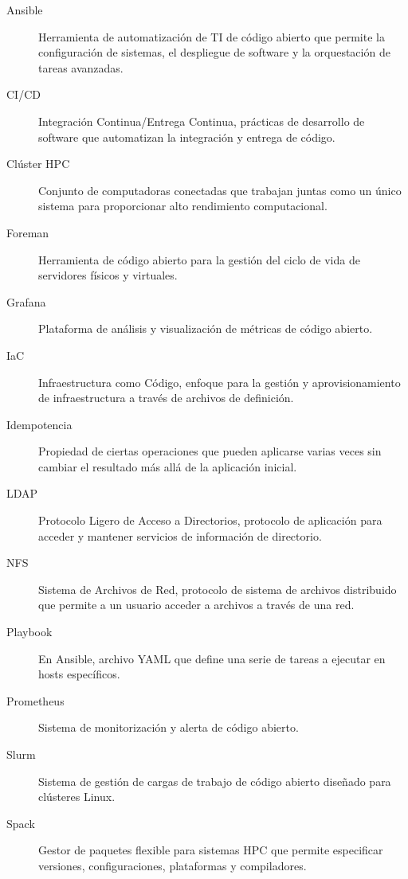 \documentclass[12pt,a4paper]{report}
\begin{document}
\begin{description}
    \item[Ansible] Herramienta de automatización de TI de código abierto que permite la configuración de sistemas, el despliegue de software y la orquestación de tareas avanzadas.
    
    \item[CI/CD] Integración Continua/Entrega Continua, prácticas de desarrollo de software que automatizan la integración y entrega de código.
    
    \item[Clúster HPC] Conjunto de computadoras conectadas que trabajan juntas como un único sistema para proporcionar alto rendimiento computacional.
    
    \item[Foreman] Herramienta de código abierto para la gestión del ciclo de vida de servidores físicos y virtuales.
    
    \item[Grafana] Plataforma de análisis y visualización de métricas de código abierto.
    
    \item[IaC] Infraestructura como Código, enfoque para la gestión y aprovisionamiento de infraestructura a través de archivos de definición.
    
    \item[Idempotencia] Propiedad de ciertas operaciones que pueden aplicarse varias veces sin cambiar el resultado más allá de la aplicación inicial.
    
    \item[LDAP] Protocolo Ligero de Acceso a Directorios, protocolo de aplicación para acceder y mantener servicios de información de directorio.
    
    \item[NFS] Sistema de Archivos de Red, protocolo de sistema de archivos distribuido que permite a un usuario acceder a archivos a través de una red.
    
    \item[Playbook] En Ansible, archivo YAML que define una serie de tareas a ejecutar en hosts específicos.
    
    \item[Prometheus] Sistema de monitorización y alerta de código abierto.
    
    \item[Slurm] Sistema de gestión de cargas de trabajo de código abierto diseñado para clústeres Linux.
    
    \item[Spack] Gestor de paquetes flexible para sistemas HPC que permite especificar versiones, configuraciones, plataformas y compiladores.
\end{description}
\end{document}
